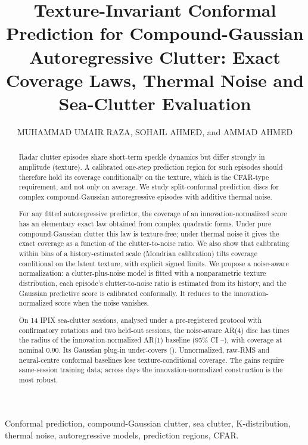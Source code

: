\documentclass[nolineno]{ieeeaccess}
\begin{document}
\history{}
\doi{}
\title{Texture-Invariant Conformal Prediction for Compound-Gaussian Autoregressive Clutter: Exact Coverage Laws, Thermal Noise and Sea-Clutter Evaluation}
\author{\uppercase{Muhammad Umair Raza},
\uppercase{Sohail Ahmed}, and
\uppercase{Ammad Ahmed}}
\address[1]{Department of Avionics Engineering, College of Aeronautical Engineering, National University of Sciences and Technology, Risalpur, Pakistan}
\address[2]{MathWorks, United States}
\address[3]{NDMA, Pakistan}
\begin{abstract}
Radar clutter episodes share short-term speckle dynamics but differ strongly in amplitude (texture). A calibrated one-step prediction region for such episodes should therefore hold its coverage conditionally on the texture, which is the CFAR-type requirement, and not only on average. We study split-conformal prediction discs for complex compound-Gaussian autoregressive episodes with additive thermal noise.

For any fitted autoregressive predictor, the coverage of an innovation-normalized score has an elementary exact law obtained from complex quadratic forms. Under pure compound-Gaussian clutter this law is texture-free; under thermal noise it gives the exact coverage as a function of the clutter-to-noise ratio. We also show that calibrating within bins of a history-estimated scale (Mondrian calibration) tilts coverage conditional on the latent texture, with explicit signed limits. We propose a noise-aware normalization: a clutter-plus-noise model is fitted with a nonparametric texture distribution, each episode's clutter-to-noise ratio is estimated from its history, and the Gaussian predictive score is calibrated conformally. It reduces to the innovation-normalized score when the noise vanishes.

On 14 IPIX sea-clutter sessions, analysed under a pre-registered protocol with confirmatory rotations and two held-out sessions, the noise-aware AR(4) disc has \RatioNAFourmSixteenA{} times the radius of the innovation-normalized AR(1) baseline (95\% CI \RatioLoNAFourmSixteenA--\RatioHiNAFourmSixteenA), with coverage \CovNAFourmSixteenA{} at nominal 0.90. Its Gaussian plug-in under-covers (\CovNAFourGmSixteenA). Unnormalized, raw-RMS and neural-centre conformal baselines lose texture-conditional coverage. The gains require same-session training data; across days the innovation-normalized construction is the most robust.
\end{abstract}
\begin{keywords}
Conformal prediction, compound-Gaussian clutter, sea clutter, K-distribution, thermal noise, autoregressive models, prediction regions, CFAR.
\end{keywords}
\maketitle
\end{document}
